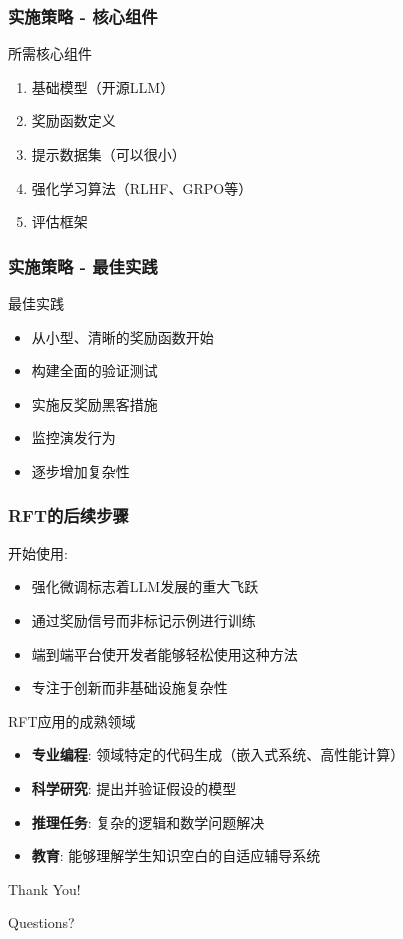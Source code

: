 \documentclass[aspectratio=169]{beamer}
\begin{document}
\begin{frame}[shrink=10]
	\frametitle{实施策略 - 核心组件}
	\begin{block}{所需核心组件}
		\begin{enumerate}
			\item 基础模型（开源LLM）
			\item 奖励函数定义
			\item 提示数据集（可以很小）
			\item 强化学习算法（RLHF、GRPO等）
			\item 评估框架
		\end{enumerate}
	\end{block}
\end{frame}

\begin{frame}[shrink=10]
	\frametitle{实施策略 - 最佳实践}
	\begin{block}{最佳实践}
		\begin{itemize}
			\item 从小型、清晰的奖励函数开始
			\item 构建全面的验证测试
			\item 实施反奖励黑客措施
			\item 监控演发行为
			\item 逐步增加复杂性
		\end{itemize}
	\end{block}
\end{frame}

\begin{frame}[shrink=10]
	\frametitle{RFT的后续步骤}
	\begin{block}{开始使用:}
		\begin{itemize}
			\item 强化微调标志着LLM发展的重大飞跃
			\item 通过奖励信号而非标记示例进行训练
			\item 端到端平台使开发者能够轻松使用这种方法
			\item 专注于创新而非基础设施复杂性
		\end{itemize}
	\end{block}
	\begin{block}{RFT应用的成熟领域}
		\begin{itemize}
			\item \textbf{专业编程}: 领域特定的代码生成（嵌入式系统、高性能计算）
			\item \textbf{科学研究}: 提出并验证假设的模型
			\item \textbf{推理任务}: 复杂的逻辑和数学问题解决
			\item \textbf{教育}: 能够理解学生知识空白的自适应辅导系统
		\end{itemize}
	\end{block}
\end{frame}

\begin{frame}{}
	\begin{center}
		\LARGE Thank You!
	\end{center}
	\begin{center}
		\large Questions?
	\end{center}
\end{frame}
\end{document}
